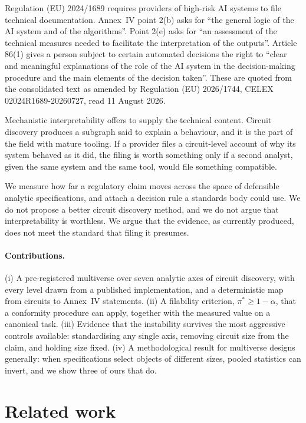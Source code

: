 \documentclass[11pt]{article}
\begin{document}
Regulation (EU) 2024/1689 requires providers of high-risk AI systems to file
technical documentation. Annex~IV point 2(b) asks for ``the general logic of the
AI system and of the algorithms''. Point 2(e) asks for ``an assessment of the
technical measures needed to facilitate the interpretation of the outputs''.
Article 86(1) gives a person subject to certain automated decisions the right to
``clear and meaningful explanations of the role of the AI system in the
decision-making procedure and the main elements of the decision taken''. These are
quoted from the consolidated text as amended by Regulation (EU) 2026/1744,
CELEX 02024R1689-20260727, read 11 August 2026.

Mechanistic interpretability offers to supply the technical content. Circuit
discovery produces a subgraph said to explain a behaviour, and it is the part of
the field with mature tooling. If a provider files a circuit-level account of why
its system behaved as it did, the filing is worth something only if a second
analyst, given the same system and the same tool, would file something compatible.

We measure how far a regulatory claim moves across the space of defensible
analytic specifications, and attach a decision rule a standards body could use. We
do not propose a better circuit discovery method, and we do not argue that
interpretability is worthless. We argue that the evidence, as currently produced,
does not meet the standard that filing it presumes.

\paragraph{Contributions.}
(i) A pre-registered multiverse over seven analytic axes of circuit discovery,
with every level drawn from a published implementation, and a deterministic map
from circuits to Annex~IV statements.
(ii) A filability criterion, $\pi^{*} \geq 1 - \alpha$, that a conformity
procedure can apply, together with the measured value on a canonical task.
(iii) Evidence that the instability survives the most aggressive controls
available: standardising any single axis, removing circuit size from the claim,
and holding size fixed.
(iv) A methodological result for multiverse designs generally: when
specifications select objects of different sizes, pooled statistics can invert,
and we show three of ours that do.

\section{Related work}
\end{document}
